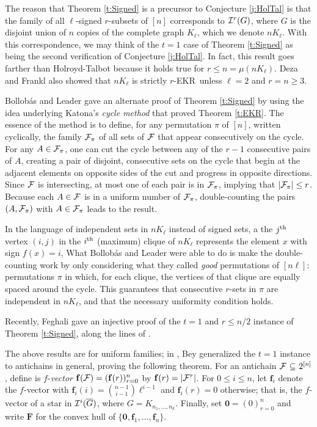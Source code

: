\documentclass{article}
\def\m{{\mu}}
\def\p{{\pi}}
\def\bz{{\mathbf{0}}}
\def\bmf{{\mathbf{f}}}
\def\bmF{{\mathbf{F}}}
\def\cF{{\cal F}}
\def\cI{{\cal I}}
\def\oG{{\overline{G}}}
\def\ekr{{\sf EKR}}
\def\sse{{\subseteq}}
\begin{document}
The reason that Theorem \ref{t:Signed} is a precursor to Conjecture \ref{j:HolTal} is that the family of all $\ell$-signed $r$-subsets of $[n]$ corresponds to $\cI^r(G)$, where $G$ is the disjoint union of $n$ copies of the complete graph $K_\ell$, which we denote $nK_\ell$.
With this correspondence, we may think of the $t=1$ case of Theorem \ref{t:Signed} as being the second verification of Conjecture \ref{j:HolTal}.
In fact, this result goes farther than Holroyd-Talbot because it holds true for $r\le n=\m(nK_\ell)$.
Deza and Frankl \cite{DezaFran} also showed that $nK_\ell$ is strictly $r$-\ekr\ unless $\ell=2$ and $r=n\ge 3$.

Bollob\'as and Leader \cite{BollLead} gave an alternate proof of Theorem \ref{t:Signed} by using the idea underlying Katona's {\it cycle method} that proved Theorem \ref{t:EKR}.
The essence of the method is to define, for any permutation $\p$ of $[n]$, written cyclically, the family $\cF_\p$ of all sets of $\cF$ that appear consecutively on the cycle.
For any $A\in\cF_\p$, one can cut the cycle between any of the $r-1$ consecutive pairs of $A$, creating a pair of disjoint, consecutive sets on the cycle that begin at the adjacent elements on opposite sides of the cut and progress in opposite directions.
Since $\cF$ is intersecting, at most one of each pair is in $\cF_\p$, implying that $|\cF_\pi|\le r$.
Because each $A\in\cF$ is in a uniform number of $\cF_\p$, double-counting the pairs $(A,\cF_\p)$ with $A\in\cF_\p$ leads to the result.

In the language of independent sets in $nK_\ell$ instead of signed sets, a the $j^{\rm th}$ vertex $(i,j)$ in the $i^{\rm th}$ (maximum) clique of  $nK_\ell$ represents the element $x$ with sign $f(x)=i$, 
What Bollob\'as and Leader were able to do is make the double-counting work by only considering what they called {\it good} permutations of $[n\ell]$: permutations $\p$ in which, for each clique, the vertices of that clique are equally spaced around the cycle. 
This guarantees that consecutive $r$-sets in $\p$ are independent in $nK_\ell$, and that the necessary uniformity condition holds.

Recently, Feghali \cite{Feghali} gave an injective proof of the $t=1$ and $r\le n/2$ instance of Theorem \ref{t:Signed}, along the lines of \cite{FranFure,HurlKamaInject}.

The above results are for uniform families; in \cite{Bey}, Bey generalized the $t=1$ instance to antichains in general, proving the following theorem.
For an antichain $\cF\ \sse\ 2^{[n]}$, define is $f$-{\it vector} $\bmf(\cF) = (\bmf(r))_{r=0}^n$ by $\bmf(r) = |\cF^r|$.
For $0\le i\le n$, let $\bmf_i$ denote the $f$-vector with $\bmf_i(i)=\binom{n-1}{i-1}\ell^{i-1}$ and $\bmf_i(r)=0$ otherwise; that is, the $f$-vector of a star in $\cI^i(\oG)$, where $G=K_{n_1,\ldots,n_k}$.
Finally, set $\bz=(0)_{r=0}^n$ and write $\bmF$ for the convex hull of $\{\bz,\bmf_1,\ldots,\bmf_n\}$.
\end{document}
